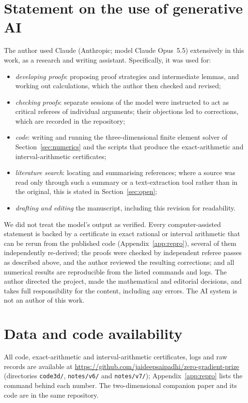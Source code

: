 \section*{Statement on the use of generative AI}
The author used Claude (Anthropic; model Claude Opus~5.5) extensively in this work, as a research and writing assistant. Specifically, it was used for:
\begin{itemize}
\item \emph{developing proofs}: proposing proof strategies and intermediate lemmas, and working out calculations, which the author then checked and revised;
\item \emph{checking proofs}: separate sessions of the model were instructed to act as critical referees of individual arguments; their objections led to corrections, which are recorded in the repository;
\item \emph{code}: writing and running the three-dimensional finite element solver of Section~\ref{sec:numerics} and the scripts that produce the exact-arithmetic and interval-arithmetic certificates;
\item \emph{literature search}: locating and summarising references; where a source was read only through such a summary or a text-extraction tool rather than in the original, this is stated in Section~\ref{sec:open};
\item \emph{drafting and editing} the manuscript, including this revision for readability.
\end{itemize}
We did not treat the model's output as verified. Every computer-assisted statement is backed by a certificate in exact rational or interval arithmetic that can be rerun from the published code (Appendix~\ref{app:repro}), several of them independently re-derived; the proofs were checked by independent referee passes as described above, and the author reviewed the resulting corrections; and all numerical results are reproducible from the listed commands and logs. The author directed the project, made the mathematical and editorial decisions, and takes full responsibility for the content, including any errors. The AI system is not an author of this work.


\section*{Data and code availability}
All code, exact-arithmetic and interval-arithmetic certificates, logs and raw records are available at \url{https://github.com/jaideepsaipadhi/zero-gradient-prize} (directories \texttt{code3d/}, \texttt{notes/v6/} and \texttt{notes/v7/}); Appendix~\ref{app:repro} lists the command behind each number. The two-dimensional companion paper \cite{PadhiLong2D} and its code are in the same repository.

